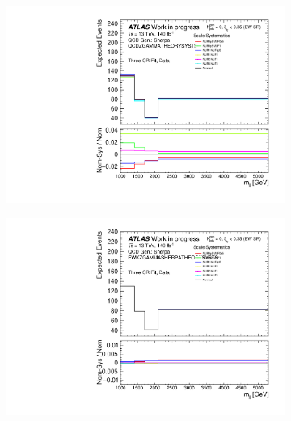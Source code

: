 \begin{figure}[t]
\begin{subfigure}[b]{0.49\textwidth}
    \includegraphics[width=\textwidth]{plots/diffx/scalesysts/data/mjj_QCD_Sh2211_QCDZGAMMATHEORYSYSTS_3cr_Scale_0p01sigma_allvariations.pdf}
    \caption{}
  \end{subfigure}
  \hfill
  \begin{subfigure}[b]{0.49\textwidth}
    \centering
    \includegraphics[width=\textwidth]{plots/diffx/scalesysts/data/mjj_QCD_Sh2211_EWKZGAMMASHERPATHEORYSYSTS_3cr_Scale_0p01sigma_allvariations.pdf}
    \caption{}
  \end{subfigure}
  \hfill
  \begin{subfigure}[b]{0.49\textwidth}
    \centering

\end{subfigure}
\end{figure}
